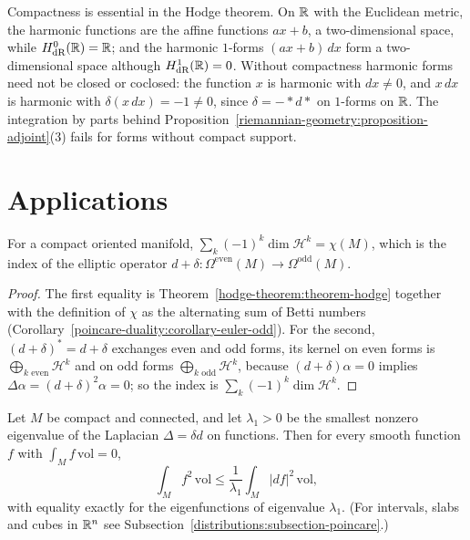 \begin{counterexample}\label{hodge-theorem:counterexample-compactness}
Compactness is essential in the Hodge theorem. On $\mathbb{R}$ with the Euclidean metric, the harmonic functions are the affine functions $ax + b$, a two-dimensional space, while $H^0_{\mathrm{dR}}(\mathbb{R}) = \mathbb{R}$; and the harmonic $1$-forms $(ax + b)\,dx$
form a two-dimensional space although $H^1_{\mathrm{dR}}(\mathbb{R}) = 0$. Without compactness harmonic forms need not be closed or coclosed: the function $x$ is harmonic with $dx \neq 0$, and $x\,dx$ is harmonic with $\delta(x\,dx) = -1 \neq 0$, since $\delta = -{*}d{*}$ on $1$-forms on $\mathbb{R}$. The
integration by parts behind Proposition~\ref{riemannian-geometry:proposition-adjoint}(3) fails for forms without compact support.
\end{counterexample}

\section{Applications}\label{hodge-theorem:section-applications}

\begin{corollary}\label{hodge-theorem:corollary-euler-characteristic}
For a compact oriented manifold, $\sum_k(-1)^k\dim\mathcal{H}^k = \chi(M)$, which is the index of the elliptic operator
$d + \delta \colon \Omega^{\mathrm{even}}(M) \to \Omega^{\mathrm{odd}}(M)$.
\end{corollary}

\begin{proof}
The first equality is Theorem~\ref{hodge-theorem:theorem-hodge} together with the definition of $\chi$ as the alternating sum of Betti numbers
(Corollary~\ref{poincare-duality:corollary-euler-odd}). For the second, $(d + \delta)^* = d + \delta$ exchanges even and odd forms, its kernel on even forms is $\bigoplus_{k \text{ even}}\mathcal{H}^k$ and on odd
forms $\bigoplus_{k \text{ odd}}\mathcal{H}^k$, because $(d + \delta)\alpha = 0$ implies $\Delta\alpha = (d+\delta)^2\alpha = 0$; so the index is $\sum_k(-1)^k\dim\mathcal{H}^k$.
\end{proof}

\begin{corollary}\label{hodge-theorem:corollary-poincare-inequality}
Let $M$ be compact and connected, and let $\lambda_1 > 0$ be the smallest nonzero eigenvalue of the Laplacian $\Delta = \delta d$ on functions. Then for every smooth function $f$ with $\int_Mf\,\mathrm{vol} = 0$,
\[
\int_Mf^2\,\mathrm{vol} \leq \frac{1}{\lambda_1}\int_M|df|^2\,\mathrm{vol},
\]
with equality exactly for the eigenfunctions of eigenvalue $\lambda_1$. (For intervals, slabs and cubes in $\mathbb{R}^n$ see Subsection~\ref{distributions:subsection-poincare}.)
\end{corollary}

